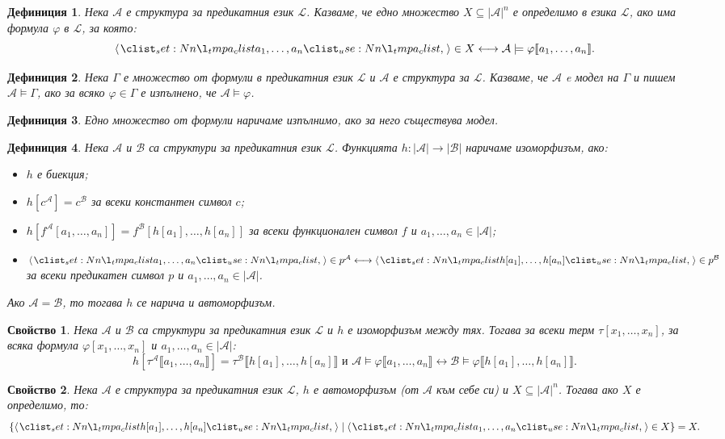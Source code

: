 \documentclass[12pt]{article}
\newcommand{\calA}{\mathcal{A}}
\newcommand{\calL}{\mathcal{L}}
\newcommand{\calB}{\mathcal{B}}
\newcommand{\db}[1]{\llbracket #1 \rrbracket}
\newtheorem*{definition}{Дефиниция}
\newtheorem*{property}{Свойство}
\theoremstyle{definition}
\begin{document}
\begin{definition}
	Нека $\calA$ е структура за предикатния език $\calL$.
	Казваме, че едно множество $X \subseteq |\calA|^n$ е определимо в езика $\calL$, ако има формула $\varphi$ в $\calL$, за която:
	\[
		\opair{a_1, \dots, a_n} \in X \longleftrightarrow \calA \models \varphi \db{a_1, \dots, a_n}.
	\]
\end{definition}

\begin{definition}
	Нека $\Gamma$ е множество от формули в предикатния език $\calL$ и $\calA$ е структура за $\calL$.
	Казваме, че $\calA$ e модел на $\Gamma$ и пишем $\calA \models \Gamma$, ако за всяко $\varphi \in \Gamma$ е изпълнено, че $\calA \models \varphi$.
\end{definition}

\begin{definition}
	Едно множество от формули наричаме изпълнимо, ако за него съществува модел.
\end{definition}

\begin{definition}
	Нека $\calA$ и $\calB$ са структури за предикатния език $\calL$.
	Функцията $h : |\calA| \rightarrow |\calB|$ наричаме изоморфизъм, ако:
	\begin{itemize}
		\item $h$ е биекция;
		\item $h[c^\calA] = c^\calB$ за всеки константен символ $c$;
		\item $h[f^\calA[a_1, \dots, a_n]] = f^\calB[h[a_1], \dots, h[a_n]]$ за всеки функционален символ $f$ и $a_1, \dots, a_n \in |\calA|$;
		\item $\opair{a_1, \dots, a_n} \in p^\calA \longleftrightarrow \opair{h[a_1], \dots, h[a_n]} \in p^\calB$ за всеки предикатен символ $p$ и $a_1, \dots, a_n \in |\calA|$.
	\end{itemize}
	Ако $\calA = \calB$, то тогава $h$ се нарича и автоморфизъм.
\end{definition}

\begin{property}
	Нека $\calA$ и $\calB$ са структури за предикатния език $\calL$ и $h$ е изоморфизъм между тях.
	Тогава за всеки терм $\tau[x_1, \dots, x_n]$, за всяка формула $\varphi[x_1, \dots, x_n]$ и $a_1, \dots, a_n \in |\calA|$:
	\[
		h[\tau^\calA\db{a_1, \dots, a_n}] = \tau^\calB\db{h[a_1], \dots, h[a_n]} \text{ и } \calA \models \varphi \db{a_1, \dots, a_n} \longleftrightarrow \calB \models \varphi \db{h[a_1], \dots, h[a_n]}.
	\]
\end{property}

\begin{property}
	Нека $\calA$ е структура за предикатния език $\calL$, $h$ е автоморфизъм (от $\calA$ към себе си) и $X \subseteq |\calA|^n$.
	Тогава ако $X$ е определимо, то:
	\[
		\{ \opair{h[a_1], \dots, h[a_n]} \mid \opair{a_1, \dots, a_n} \in X \} = X.
	\]
\end{property}
\end{document}

